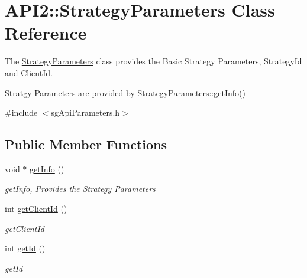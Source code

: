 \hypertarget{class_a_p_i2_1_1_strategy_parameters}{\section{A\-P\-I2\-:\-:Strategy\-Parameters Class Reference}
\label{class_a_p_i2_1_1_strategy_parameters}
}


The \hyperlink{class_a_p_i2_1_1_strategy_parameters}{Strategy\-Parameters} class provides the Basic Strategy Parameters, Strategy\-Id and Client\-Id.\par
 Stratgy Parameters are provided by \hyperlink{class_a_p_i2_1_1_strategy_parameters_a6a7c4d4c3e6cae23741c87732e89689a}{Strategy\-Parameters\-::get\-Info()}  




{\ttfamily \#include $<$sg\-Api\-Parameters.\-h$>$}

\subsection*{Public Member Functions}
\begin{DoxyCompactItemize}
\item 
void $\ast$ \hyperlink{class_a_p_i2_1_1_strategy_parameters_a6a7c4d4c3e6cae23741c87732e89689a}{get\-Info} ()
\begin{DoxyCompactList}\small\item\em get\-Info, Provides the Strategy Parameters \end{DoxyCompactList}\item 
int \hyperlink{class_a_p_i2_1_1_strategy_parameters_ad7f5051101186f72e9b9e265b49905c3}{get\-Client\-Id} ()
\begin{DoxyCompactList}\small\item\em get\-Client\-Id \end{DoxyCompactList}\item 
int \hyperlink{class_a_p_i2_1_1_strategy_parameters_ab03303184656b38f0fd352a21c4b9928}{get\-Id} ()
\begin{DoxyCompactList}\small\item\em get\-Id \end{DoxyCompactList}\end{DoxyCompactItemize}
